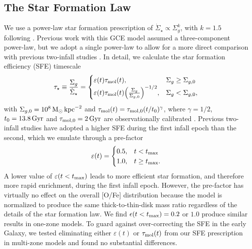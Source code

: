 \documentclass[twocolumn,twocolappendix,linenumbers]{aastex631}
\newcommand{\kpc}{\,{\rm kpc}}
\begin{document}
\subsection{The Star Formation Law}
\label{sec:sf-law}

We use a power-law star formation prescription of $\dot\Sigma_\star\propto\Sigma_g^k$, with $k=1.5$ following \citet{kennicutt_global_1998}. Previous work with this GCE model \citep[e.g.,][]{johnson_stellar_2021,dubay_galactic_2024} assumed a three-component power-law, but we adopt a single power-law to allow for a more direct comparison with previous two-infall studies \citep[e.g.,][]{spitoni_remind_2024}. In detail, we calculate the star formation efficiency (SFE) timescale
\begin{equation}
    \label{eq:sf-law}
    \tau_\star \equiv \frac{\Sigma_g}{\dot\Sigma_\star} = 
    \begin{cases}
        \varepsilon(t) \tau_{\rm mol}(t),   & \Sigma_g \ge \Sigma_{g,0} \\
        \varepsilon(t) \tau_{\rm mol}(t) \Big(\frac{\Sigma_g}{\Sigma_{g,0}}\Big)^{-1/2}, & \Sigma_g < \Sigma_{g,0},
    \end{cases}
\end{equation}
with $\Sigma_{g,0} = 10^8\,{\rm M}_\odot\kpc^{-2}$ and $\tau_{\rm mol}(t)=\tau_{\rm mol,0}(t/t_0)^\gamma$, where $\gamma=1/2$, $t_0=13.8\,{\rm Gyr}$ and $\tau_{\rm mol,0}=2\,{\rm Gyr}$ are observationally calibrated \citep{leroy_star_2008}. Previous two-infall studies \citep[e.g.,][]{spitoni_galactic_2019,spitoni_galactic_2020,palla_chemical_2020} have adopted a higher SFE during the first infall epoch than the second, which we emulate through a pre-factor
\begin{equation}
    \label{eq:sfe-prefactor}
    \varepsilon(t) = 
    \begin{cases}
        0.5, & t < t_{\rm max} \\
        1.0, & t \ge t_{\rm max}.
    \end{cases}
\end{equation}
A lower value of $\varepsilon(t<t_{\rm max})$ leads to more efficient star formation, and therefore more rapid enrichment, during the first infall epoch. However, the pre-factor has virtually no effect on the overall [O/Fe] distribution because the model is normalized to produce the same thick-to-thin-disk mass ratio regardless of the details of the star formation law. We find $\epsilon(t<t_{\rm max})=0.2$ or $1.0$ produce similar results in one-zone models. To guard against over-correcting the SFE in the early Galaxy, we tested eliminating either $\varepsilon(t)$ or $\tau_{\rm mol}(t)$ from our SFE prescription in multi-zone models and found no substantial differences.
\end{document}
